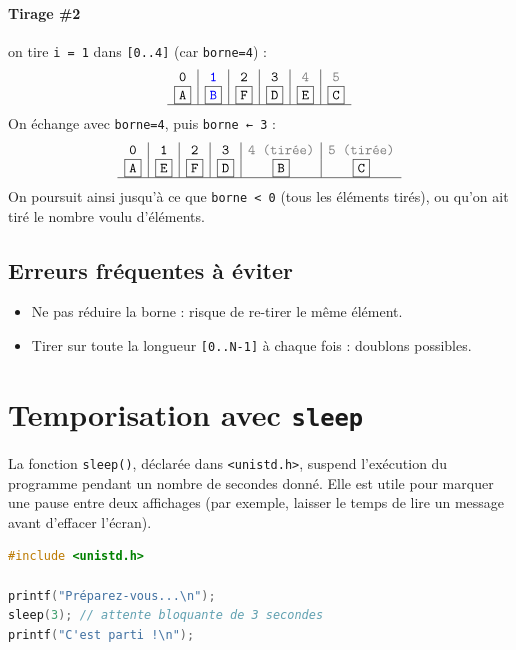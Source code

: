 \paragraph{Tirage \#2} on tire \texttt{i = 1} dans \texttt{[0..4]} (car \texttt{borne=4}) :
\[
\begin{array}{c|c|c|c|c|c}
\texttt{0} & \color{blue}{\texttt{1}} & \texttt{2} & \texttt{3} & \color{gray}{\texttt{4}} & \color{gray}{\texttt{5}}\\
\boxed{\texttt{A}} & \boxed{\color{blue}{\texttt{B}}} & \boxed{\texttt{F}} & \boxed{\texttt{D}} & \boxed{\texttt{E}} & \fbox{\texttt{C}} \\
\hline
\end{array}
\]
On échange avec \texttt{borne=4}, puis \texttt{borne ← 3} :
\[
\begin{array}{c|c|c|c|c|c}
\texttt{0} & \texttt{1} & \texttt{2} & \texttt{3} & \color{gray}{\texttt{4 (tirée)}} & \color{gray}{\texttt{5 (tirée)}}\\
\boxed{\texttt{A}} & \boxed{\texttt{E}} & \boxed{\texttt{F}} & \boxed{\texttt{D}} & \fbox{\texttt{B}} & \fbox{\texttt{C}} \\
\hline
\end{array}
\]
On poursuit ainsi jusqu'à ce que \texttt{borne < 0} (tous les éléments tirés), ou qu'on ait tiré le nombre voulu d'éléments.

\subsection{Erreurs fréquentes à éviter}
\begin{itemize}
  \item Ne pas réduire la borne : risque de re-tirer le même élément.
  \item Tirer sur toute la longueur \texttt{[0..N-1]} à chaque fois : doublons possibles.
\end{itemize}

\section{Temporisation avec \texttt{sleep}}

La fonction \texttt{sleep()}, déclarée dans \texttt{<unistd.h>}, suspend
l'exécution du programme pendant un nombre de secondes donné. Elle est
utile pour marquer une pause entre deux affichages (par exemple, laisser
le temps de lire un message avant d'effacer l'écran).

\begin{lstlisting}[language=C]
#include <unistd.h>

printf("Préparez-vous...\n");
sleep(3); // attente bloquante de 3 secondes
printf("C'est parti !\n");
\end{lstlisting}

